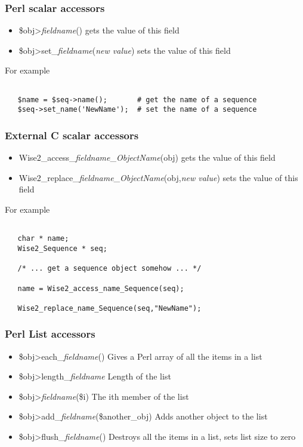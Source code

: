 \subsubsection{Perl scalar accessors}

\begin{itemize}
\item \$obj\->\emph{fieldname}() gets the value of this field
\item \$obj\->set\_\emph{fieldname}(\emph{new value}) sets the value of this field
\end{itemize}

For example
\begin{verbatim}

   $name = $seq->name();       # get the name of a sequence
   $seq->set_name('NewName');  # set the name of a sequence

\end{verbatim}

\subsubsection{External C scalar accessors}

\begin{itemize}
\item Wise2\_access\_\emph{fieldname}\_\emph{ObjectName}(obj) gets the value of this field
\item Wise2\_replace\_\emph{fieldname}\_\emph{ObjectName}(obj,\emph{new value}) sets the value of this field
\end{itemize}

For example
\begin{verbatim}

   char * name;
   Wise2_Sequence * seq;

   /* ... get a sequence object somehow ... */
	
   name = Wise2_access_name_Sequence(seq);
   
   Wise2_replace_name_Sequence(seq,"NewName");

\end{verbatim}

\subsubsection{Perl List accessors}

\begin{itemize}
\item \$obj\->each\_\emph{fieldname}() Gives a Perl array of all the items in a list
\item \$obj\->length\_\emph{fieldname} Length of the list
\item \$obj\->\emph{fieldname}(\$i) The ith member of the list
\item \$obj\->add\_\emph{fieldname}(\$another\_obj) Adds another object to the list
\item \$obj\->flush\_\emph{fieldname}() Destroys all the items in a list, sets list size to zero
\end{itemize}

